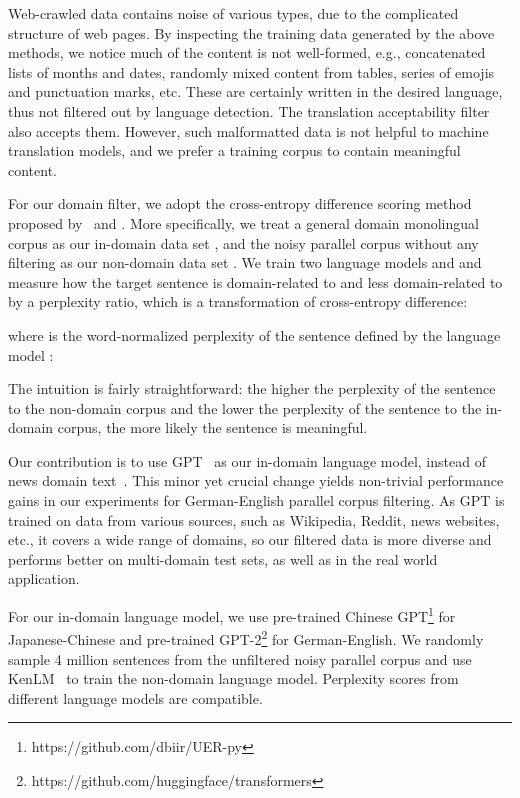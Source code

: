 \documentclass[11pt,a4paper]{article}
\begin{document}
Web-crawled data contains noise of various types, due to the complicated structure of web pages. By inspecting the training data generated by the above methods, we notice much of the content is not well-formed, e.g., concatenated lists of months and dates, randomly mixed content from tables, series of emojis and punctuation marks, etc. These are certainly written in the desired language, thus not filtered out by language detection. The translation acceptability filter also accepts them.  However, such malformatted data is not helpful to machine translation models, and we prefer a training corpus to contain meaningful content.


For our domain filter, we adopt the cross-entropy difference scoring method proposed by~\citet{moore-lewis-2010-intelligent} and \citet{junczys2018dual}. More specifically, we treat a general domain monolingual corpus as our in-domain data set , and the noisy parallel corpus without any filtering as our non-domain data set . We train two language models  and  and measure how the target sentence  is domain-related to  and less domain-related to  by a perplexity ratio, which is a transformation of cross-entropy difference:

where  is the word-normalized perplexity of the sentence  defined by the language model :

The intuition is fairly straightforward: the higher the perplexity of the sentence to the non-domain corpus and the lower the perplexity of the sentence to the in-domain corpus, the more likely the sentence is meaningful.

Our contribution is to use GPT~\cite{radford2019language} as our in-domain language model, instead of news domain text~\cite{junczys2018dual}. This minor yet crucial change yields non-trivial performance gains in our experiments for German-English parallel corpus filtering. As GPT is trained on data from various sources, such as Wikipedia, Reddit, news websites, etc., it covers a wide range of domains, so our filtered data is more diverse and performs better on multi-domain test sets, as well as in the real world application.

For our in-domain language model, we use pre-trained Chinese GPT\footnote{https://github.com/dbiir/UER-py} for Japanese-Chinese and pre-trained GPT-2\footnote{https://github.com/huggingface/transformers} for German-English. We randomly sample 4 million sentences from the unfiltered noisy parallel corpus and use KenLM~\cite{heafield2011kenlm} to train the non-domain language model.  Perplexity scores from different language models are compatible.
\end{document}

